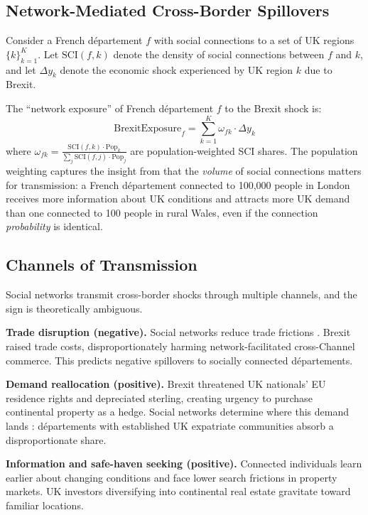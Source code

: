 \documentclass[12pt]{article}
\begin{document}
\subsection{Network-Mediated Cross-Border Spillovers}

Consider a French d\'epartement $f$ with social connections to a set of UK regions $\{k\}_{k=1}^{K}$. Let $\text{SCI}(f,k)$ denote the density of social connections between $f$ and $k$, and let $\Delta y_k$ denote the economic shock experienced by UK region $k$ due to Brexit.

The ``network exposure'' of French d\'epartement $f$ to the Brexit shock is:
\begin{equation}
\text{BrexitExposure}_f = \sum_{k=1}^{K} \omega_{fk} \cdot \Delta y_k
\label{eq:exposure}
\end{equation}
where $\omega_{fk} = \frac{\text{SCI}(f,k) \cdot \text{Pop}_k}{\sum_{j} \text{SCI}(f,j) \cdot \text{Pop}_j}$ are population-weighted SCI shares. The population weighting captures the insight from \citet{bailey2018social} that the \textit{volume} of social connections matters for transmission: a French d\'epartement connected to 100,000 people in London receives more information about UK conditions and attracts more UK demand than one connected to 100 people in rural Wales, even if the connection \textit{probability} is identical.

\subsection{Channels of Transmission}

Social networks transmit cross-border shocks through multiple channels, and the sign is theoretically ambiguous.

\textbf{Trade disruption (negative).} Social networks reduce trade frictions \citep{rauch1999networks, chaney2014network, bailey2021international}. Brexit raised trade costs, disproportionately harming network-facilitated cross-Channel commerce. This predicts negative spillovers to socially connected d\'epartements.

\textbf{Demand reallocation (positive).} Brexit threatened UK nationals' EU residence rights and depreciated sterling, creating urgency to purchase continental property as a hedge. Social networks determine where this demand lands \citep{bailey2018house, burchardi2013economic}: d\'epartements with established UK expatriate communities absorb a disproportionate share.

\textbf{Information and safe-haven seeking (positive).} Connected individuals learn earlier about changing conditions and face lower search frictions in property markets. UK investors diversifying into continental real estate gravitate toward familiar locations.
\end{document}
